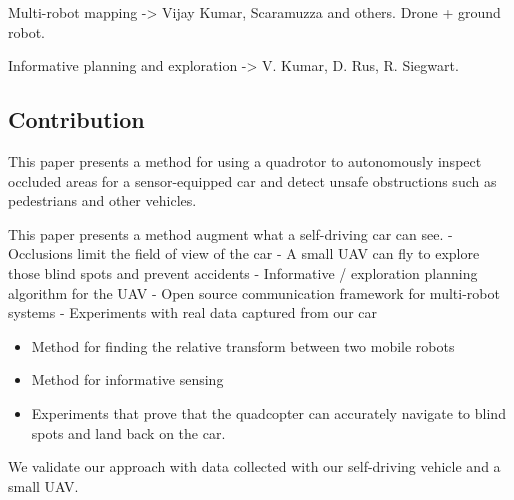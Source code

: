 Multi-robot mapping -> Vijay Kumar, Scaramuzza and others. Drone + ground robot.

Informative planning and exploration -> V. Kumar, D. Rus, R. Siegwart.

\subsection{Contribution}

This paper presents a method for using a quadrotor to autonomously inspect
occluded areas for a sensor-equipped car and detect unsafe obstructions such as
pedestrians and other vehicles.

This paper presents a method augment what a self-driving car can see.
- Occlusions limit the field of view of the car
- A small UAV can fly to explore those blind spots and prevent accidents
- Informative / exploration planning algorithm for the UAV
- Open source communication framework for multi-robot systems
- Experiments with real data captured from our car 

\begin{itemize}
\item
Method for finding the relative transform between two mobile robots
\item
Method for informative sensing
\item
Experiments that prove that the quadcopter can accurately navigate
to blind spots and land back on the car.
\end{itemize}

We validate our approach with data collected with our self-driving vehicle and a small UAV.
